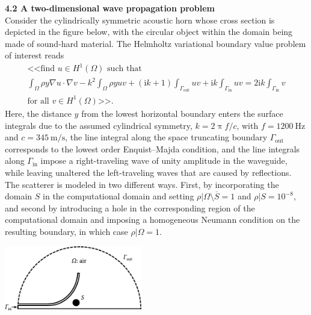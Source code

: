 \documentclass[9pt]{amsart}
\theoremstyle{remark}
\theoremstyle{definition}
\begin{document}
\vspace*{0.2cm}
\textbf{4.2 A two-dimensional wave propagation problem}\\
Consider the cylindrically symmetric acoustic horn whose cross section is depicted in the figure below, with the circular object within the domain being made of sound-hard material. The  Helmholtz variational boundary value problem of interest reads
\begin{align*}
&\text{<<find }u\in H^1(\varOmega)\text{ such that }&\\
&\int_\varOmega \rho y\nabla u \cdot \nabla v - k^2\int_\varOmega \rho y u v + (\mathrm{i}k+1)\int_{\varGamma_\mathrm{out}} uv + \mathrm{i}k\int_{\varGamma_\mathrm{in}} uv=2\mathrm{i}k\int_{\varGamma_\mathrm{in}}v\\
&\text{for all }v\in H^1(\varOmega)\text{>>}.
\end{align*}
Here, the distance $y$ from the lowest horizontal boundary enters the surface integrals due to the assumed cylindrical symmetry, $k=2\uppi f/c$, with $f=1200~\mathrm{Hz}$ and $c=345~\mathrm{m/s}$, the line integral along the space truncating boundary $\varGamma_\mathrm{out}$ corresponds to the lowest order Enquist–Majda condition, and the line integrals along $\varGamma_\mathrm{in}$ impose a right-traveling wave of unity amplitude in the waveguide, while leaving unaltered the left-traveling waves that are caused by reflections. The scatterer is modeled in two different ways. First, by incorporating the domain $S$ in the computational domain and setting $\rho|\varOmega\setminus\overline{S}=1$ and $\rho|S=10^{-8}$, and second by introducing a hole in the corresponding region of the computational domain and imposing a homogeneous Neumann condition on the resulting boundary, in which case $\rho|\varOmega=1$.
%
\begin{center}
\includegraphics[width=0.45\textwidth]{figs/30}
\end{center}
%
\end{document}
